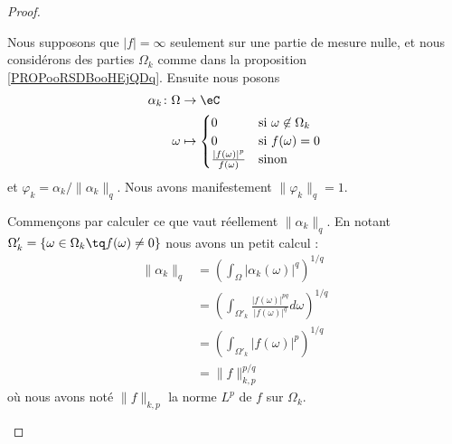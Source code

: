 \begin{proof}
\begin{subproof}
		Nous supposons que \( | f |=\infty\) seulement sur une partie de mesure nulle, et nous considérons des parties \( \Omega_k\) comme dans la proposition \ref{PROPooRSDBooHEjQDq}. Ensuite nous posons
		\begin{equation}
			\begin{aligned}
				\alpha_k\colon \Omega & \to \eC                                                                          \\
				\omega                & \mapsto \begin{cases}
					                                0                                     & \text{si } \omega\not\in\Omega_k \\
					                                0                                     & \text{si } f(\omega)=0           \\
					                                \frac{ | f(\omega) |^p }{ f(\omega) } & \text{sinon }
				                                \end{cases}
			\end{aligned}
		\end{equation}
		et \( \varphi_k=\alpha_k/\| \alpha_k \|_q\). Nous avons manifestement \( \| \varphi_k \|_q=1\).

		Commençons par calculer ce que vaut réellement \( \| \alpha_k \|_q\). En notant \( \Omega'_k=\{ \omega\in \Omega_k\tq f(\omega)\neq 0 \}\) nous avons un petit calcul :
		\begin{subequations}
			\begin{align}
				\| \alpha_k \|_q & =\left(  \int_{\Omega}| \alpha_k(\omega) |^q \right)^{1/q}                                     \\
				                 & =\left(  \int_{\Omega'_k}\frac{ | f(\omega) |^{pq} }{ | f(\omega) |^q }d\omega   \right)^{1/q} \\
				                 & =\left( \int_{\Omega'_k}| f(\omega) |^p \right)^{1/q}                                          \\
				                 & = \| f \|_{k,p}^{p/q}
			\end{align}
		\end{subequations}
		où nous avons noté \( \| f \|_{k,p}\) la norme \( L^p\) de \( f\) sur \( \Omega_k\).


\end{subproof}
\end{proof}
